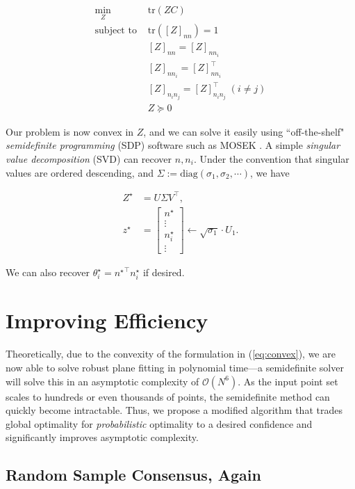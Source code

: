 \documentclass[conference]{IEEEtran}
\begin{document}
\begin{align}
	\min_Z \; & \mathrm{tr}(ZC) \\
	\text{subject to } & \mathrm{tr}([Z]_{n n}) = 1 \\
	& [Z]_{n n} = [Z]_{n n_i} \\
	& [Z]_{n n_i} = [Z]_{n n_i}^\top \\
	& [Z]_{n_i n_j} = [Z]_{n_i n_j}^\top \; (i \ne j) \\
	& Z \succeq 0
	\label{eq:convex}
\end{align}

Our problem is now convex in \( Z \), and we can solve it easily using ``off-the-shelf" \textit{semidefinite programming} (SDP) software such as MOSEK \cite{mosek}.  A simple \textit{singular value decomposition} (SVD) can recover \( n, n_i \).  Under the convention that singular values are ordered descending, and \( \Sigma := \mathrm{diag}(\sigma_1, \sigma_2, \cdots) \), we have

\begin{align}
	Z^\star &= U \Sigma V^\top , \\
	z^\star &= \begin{bmatrix}
		n^\star \\
		\vdots \\
		n_i^\star \\
		\vdots
	\end{bmatrix} \gets \sqrt{\sigma_1} \cdot U_1 .
\end{align}

We can also recover \( \theta_i^\star = {n^\star}^\top n_i^\star \) if desired.

\section{Improving Efficiency}

Theoretically, due to the convexity of the formulation in (\ref{eq:convex}), we are now able to solve robust plane fitting in polynomial time---a semidefinite solver will solve this in an asymptotic complexity of \( \mathcal{O}(N^6) \).  As the input point set scales to hundreds or even thousands of points, the semidefinite method can quickly become intractable.  Thus, we propose a modified algorithm that trades global optimality for \textit{probabilistic} optimality to a desired confidence and significantly improves asymptotic complexity.

\subsection{Random Sample Consensus, Again}
\end{document}
